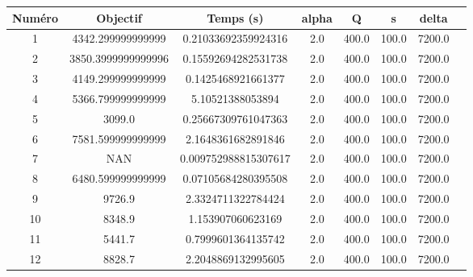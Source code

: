 \begin{tabular}{|c|c|c|c|c|c|c|c|}
\hline
 Numéro & Objectif & Temps (s) & alpha & Q & s & delta \\
\hline
1 & 4342.299999999999 & 0.21033692359924316 & 2.0 & 400.0 & 100.0 & 7200.0 \\ 
 \hline
2 & 3850.3999999999996 & 0.15592694282531738 & 2.0 & 400.0 & 100.0 & 7200.0 \\ 
 \hline
3 & 4149.299999999999 & 0.1425468921661377 & 2.0 & 400.0 & 100.0 & 7200.0 \\ 
 \hline
4 & 5366.799999999999 & 5.10521388053894 & 2.0 & 400.0 & 100.0 & 7200.0 \\ 
 \hline
5 & 3099.0 & 0.25667309761047363 & 2.0 & 400.0 & 100.0 & 7200.0 \\ 
 \hline
6 & 7581.599999999999 & 2.1648361682891846 & 2.0 & 400.0 & 100.0 & 7200.0 \\ 
 \hline
7 & NAN & 0.009752988815307617 & 2.0 & 400.0 & 100.0 & 7200.0 \\ 
 \hline
8 & 6480.599999999999 & 0.07105684280395508 & 2.0 & 400.0 & 100.0 & 7200.0 \\ 
 \hline
9 & 9726.9 & 2.3324711322784424 & 2.0 & 400.0 & 100.0 & 7200.0 \\ 
 \hline
10 & 8348.9 & 1.153907060623169 & 2.0 & 400.0 & 100.0 & 7200.0 \\ 
 \hline
11 & 5441.7 & 0.7999601364135742 & 2.0 & 400.0 & 100.0 & 7200.0 \\ 
 \hline
12 & 8828.7 & 2.2048869132995605 & 2.0 & 400.0 & 100.0 & 7200.0 \\ 
 \hline
\end{tabular}
